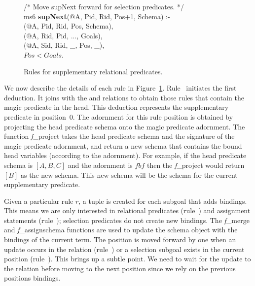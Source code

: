 \begin{figure}[!t]
\begin{boxedminipage}{\linewidth}
/* Move supNext forward for selection predicates. */ \\
ms6 {\bf supNext}(@A, Pid, Rid, Pos+1, Schema) :- \\
(@A, Pid, Rid, Pos, Schema), \\
(@A, Rid, Pid, ..., Goals), \\
(@A, Sid, Rid, \_, Pos, \_), \\
\datalogspace $Pos < Goals$. 
\end{boxedminipage}
\caption{\label{ch:magic:fig:magic2}Rules for supplementary relational predicates.}
\end{figure}

We now describe the details of each rule in Figure~\ref{ch:magic:fig:magic2}.
Rule~ initiates the first  deduction.  It joins 
with the  and  relations to obtain those rules that
contain the magic predicate in the head.  This deduction represents the
supplementary predicate in position~$0$.  The adornment for this rule position
is obtained by projecting the head predicate schema onto the magic predicate
adornment.  The function {\emph f\_project} takes the head predicate schema and
the signature of the magic predicate adornment, and return a new schema that
contains the bound head variables (according to the adornment). For example,
if the head predicate schema is $[A, B, C]$ and the adornment is $fbf$ then
the {\emph f\_project} would return $[B]$ as the new schema. This new schema
will be the schema for the current supplementary predicate.

Given a particular rule $r$, a  tuple is created for each subgoal that
adds bindings.  This means we are only interested in relational predicates
(rule~) and assignment statements (rule~); selection predicates
do not create new bindings.  The {\emph f\_merge} and {\emph f\_assignschema}
functions are used to update the schema object with the bindings of the current
term.  The  position is moved forward by one when an update occurs
in the  relation (rule~) or a selection subgoal exists in the current
 position (rule~). This brings up a subtle point. We need to 
wait for the update to the  relation before moving to the next position
since we rely on the previous positions bindings. 


